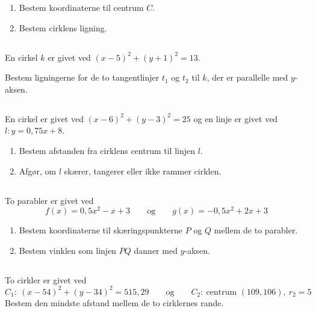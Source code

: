 \documentclass[10pt,a4paper,table]{article}
\begin{document}
\begin{enumerate}
  \item Bestem koordinaterne til centrum $C$.
  \item Bestem cirklens ligning.
\end{enumerate}


\subsection{}

En cirkel $k$ er givet ved $(x-5)^2 + (y+1)^2 = 13$.

Bestem ligningerne for de to tangentlinjer $t_1$ og $t_2$ til $k$, der er parallelle med $y$-aksen.


\subsection{}

En cirkel er givet ved $(x-6)^2 + (y-3)^2 = 25$ og en linje er givet ved $l: y = 0{,}75x + 8$.

\begin{enumerate}
  \item Bestem afstanden fra cirklens centrum til linjen $l$.
  \item Afgør, om $l$ skærer, tangerer eller ikke rammer cirklen.
\end{enumerate}


\subsection{}

To parabler er givet ved
\[
  f(x) = 0{,}5x^2 - x + 3 \qquad \text{og} \qquad g(x) = -0{,}5x^2 + 2x + 3
\]

\begin{enumerate}
  \item Bestem koordinaterne til skæringspunkterne $P$ og $Q$ mellem de to parabler.
  \item Bestem vinklen som linjen $PQ$ danner med $y$-aksen.
\end{enumerate}


\subsection{}

To cirkler er givet ved
\[
  C_1{:}\ (x-54)^2 + (y-34)^2 = 515{,}29 \qquad \text{og} \qquad C_2{:}\ \text{centrum } (109, 106),\ r_2 = 5
\]
Bestem den mindste afstand mellem de to cirklernes rande.
\end{document}
